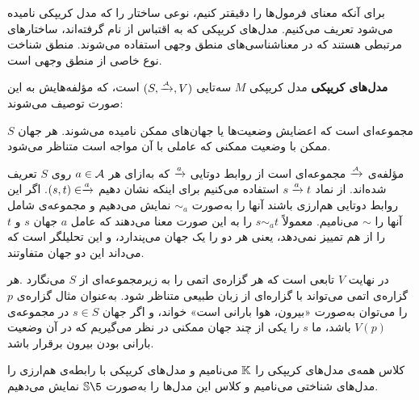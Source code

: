 برای آنکه معنای فرمول‌ها را دقیقتر کنیم، نوعی ساختار را که مدل کریپکی نامیده می‌شود تعریف می‌کنیم. مدل‌های کریپکی که به اقتباس از  نام گرفته‌اند، ساختارهای مرتبطی هستند که در معنا‌شناسی‌های منطق وجهی استفاده می‌شوند. منطق شناخت نوع خاصی از منطق وجهی است. 
\begin{definition}\textbf{مدل‌های کریپکی}
مدل کریپکی $M$ سه‌تایی $(S,\xrightarrow{\scriptscriptstyle{\mathcal{A}}},V)$ است، که مؤلفه‌هایش به این صورت توصیف می‌شوند:

$S$ 
مجموعه‌ای است که اعضایش وضعیت‌ها یا جهان‌های ممکن
نامیده می‌شوند. هر جهان ممکن با وضعیت ممکنی که عاملی با آن مواجه است متناظر می‌شود. 

مؤلفه‌ی $\xrightarrow{\scriptscriptstyle{\mathcal{A}}}$ مجموعه‌ای است از روابط دوتایی $\xrightarrow{a}$ که به‌ازای هر $ a\in\mathcal{A} $ روی $ S $ تعریف شده‌اند. از نماد $ s\xrightarrow{a}t $ استفاده می‌کنیم برای اینکه نشان دهیم $ (s,t)\in\xrightarrow{a} $. اگر این روابط دوتایی هم‌ارزی باشند آنها را به‌صورت $ \sim_a $ نمایش می‌دهیم و مجموعه‌ی شامل آنها را $ \sim $ می‌نامیم. معمولاً $ s\sim_a t $ را به این صورت معنا می‌دهند که عامل $a$ جهان $ s $ و $ t $ را از هم تمییز
نمی‌دهد، یعنی هر دو را یک جهان می‌پندارد، و این تحلیلگر است که می‌داند این دو جهان متفاوتند.

در نهایت $V$ تابعی است که هر گزاره‌ی اتمی را به زیرمجموعه‌ای از $ S $ می‌نگارد .هر گزاره‌ی اتمی می‌تواند با گزاره‌ای از زبان طبیعی متناظر شود. به‌عنوان مثال گزاره‌ی $ p $ را می‌توان به‌صورت «بیرون، هوا بارانی است» خواند، و اگر جهان $ s \in S $ در مجموعه‌ی $ V(p) $ باشد، ما $ s $ را یکی از چند جهان ممکنی در نظر می‌گیریم که در آن وضعیت بارانی بودن بیرون برقرار باشد.

کلاس همه‌ی مدل‌های کریپکی را $ \mathbb{K} $ می‌نامیم و مدل‌های کریپکی با رابطه‌ی هم‌ارزی را مدل‌های شناختی 
می‌نامیم و کلاس این مدل‌ها را به‌صورت $ \mbbS\5 $ نمایش می‌دهیم.
\end{definition}
